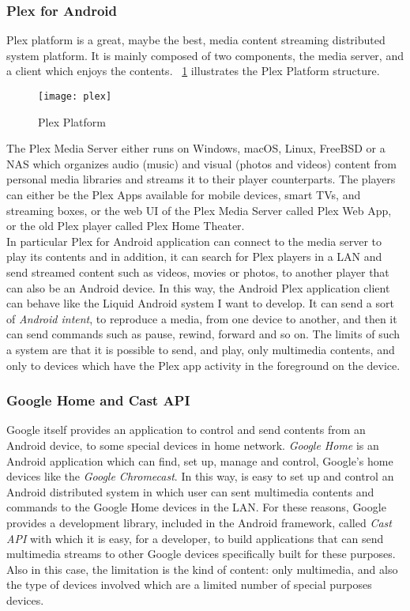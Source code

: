 \subsubsection{Plex for Android}
Plex platform is a great, maybe the best, media content streaming distributed system platform. It is mainly composed of two components, the media server, and a client which enjoys the contents. \figurename~\ref{fig:4.1} illustrates the Plex Platform structure.\\
\begin{figure}[h]
	\centering
	\texttt{[image: plex]}
	\caption{Plex Platform}
	\label{fig:4.1}
\end{figure}
The Plex Media Server either runs on Windows, macOS, Linux, FreeBSD or a NAS which organizes audio (music) and visual (photos and videos) content from personal media libraries and streams it to their player counterparts.
The players can either be the Plex Apps available for mobile devices, smart TVs, and streaming boxes, or the web UI of the Plex Media Server called Plex Web App, or the old Plex player called Plex Home Theater.\\
In particular Plex for Android application can connect to the media server to play its contents and in addition, it can search for Plex players in a LAN and send streamed content such as videos, movies or photos, to another player that can also be an Android device. In this way, the Android Plex application client can behave like the Liquid Android system I want to develop. It can send a sort of \textit{Android intent}, to reproduce a media, from one device to another, and then it can send commands such as pause, rewind, forward and so on. The limits of such a system are that it is possible to send, and play, only multimedia contents, and only to devices which have the Plex app activity in the foreground on the device.

\subsubsection{Google Home and Cast API}
Google itself provides an application to control and send contents from an Android device, to some special devices in home network. \textit{Google Home} is an Android application which can find, set up, manage and control, Google's home devices like the \textit{Google Chromecast}. In this way, is easy to set up and control an Android distributed system in which user can sent multimedia contents and commands to the Google Home devices in the LAN. For these reasons, Google provides a development library, included in the Android framework, called \textit{Cast API} with which it is easy, for a developer, to build applications that can send multimedia streams to other Google devices specifically built for these purposes.\\
Also in this case, the limitation is the kind of content: only multimedia, and also the type of devices involved which are a limited number of special purposes devices.

